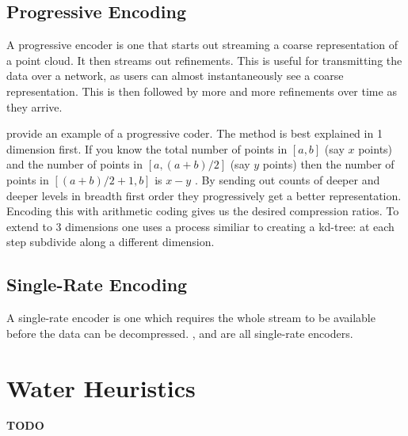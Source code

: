 \documentclass{report}
\begin{document}
\subsection{Progressive Encoding}

A progressive encoder is one that starts out streaming a coarse representation
of a point cloud. It then streams out refinements. This is useful for
transmitting the data over a network, as users can almost instantaneously see
a coarse representation. This is then followed by more and more refinements
over time as they arrive.

\citet{devillers2000gci} provide an example of a progressive coder. The method
is best explained in 1 dimension first. If you know the total number of points
in $[a, b]$ (say $x$ points) and the number of points in $[a, (a+b)/2]$ (say
$y$ points) then the number of points in $[(a+b)/2+1, b]$ is $x - y$ . By
sending out counts of deeper and deeper levels in breadth first order they
progressively get a better representation. Encoding this with arithmetic
coding gives us the desired compression ratios. To extend to 3 dimensions one
uses a process similiar to creating a kd-tree: at each step subdivide along a
different dimension.


\subsection{Single-Rate Encoding}

A single-rate encoder is one which requires the whole stream to be available
before the data can be decompressed. \citet{omeltchenko2000sls},
\citet{gumholdcomp} and \citet{merrycomp} are all single-rate encoders.


\section{Water Heuristics}

\textbf{TODO}

\end{document}
